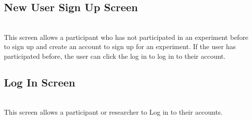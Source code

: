 \subsection{New User Sign Up Screen}
\setlength\fboxsep{0pt}
\setlength\fboxrule{0.5pt}
\\
This screen allows a participant who has not participated in an experiment before to sign up and create an account to sign up for an experiment.  If the user has participated before, the user can click the log in to log in to their account.

\subsection{Log In Screen}
\setlength\fboxsep{0pt}
\setlength\fboxrule{0.5pt}
\\
This screen allows a participant or researcher to Log in to their accounts.

